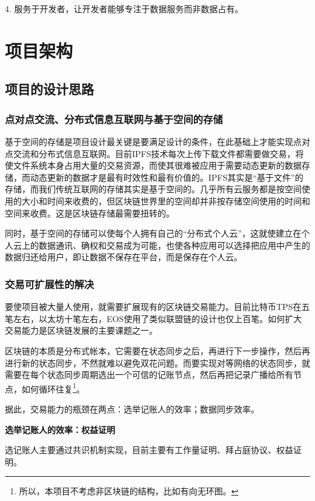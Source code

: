 \documentclass[a4paper,12pt]{article}
\begin{document}
4. 服务于开发者，让开发者能够专注于数据服务而非数据占有。

\section{项目架构}

\subsection{项目的设计思路}
\subsubsection{点对点交流、分布式信息互联网与基于空间的存储}

基于空间的存储是项目设计最关键是要满足设计的条件，在此基础上才能实现点对点交流和分布式信息互联网。目前IPFS技术每次上传下载文件都需要做交易，将使文件系统本身占用大量的交易资源，而使其很难被应用于需要动态更新的数据存储，而动态更新的数据才是最有时效性和最有价值的。IPFS其实是“基于文件”的存储，而我们传统互联网的存储其实是基于空间的。几乎所有云服务都是按空间使用的大小和时间来收费的，但区块链世界里的空间却并非按存储空间使用的时间和空间来收费。这是区块链存储最需要扭转的。

同时，基于空间的存储可以使每个人拥有自己的“分布式个人云”，这就使建立在个人云上的数据通讯、确权和交易成为可能，也使各种应用可以选择把应用中产生的数据归还给用户，即让数据不保存在平台，而是保存在个人云。

\subsubsection{交易可扩展性的解决}

要使项目被大量人使用，就需要扩展现有的区块链交易能力。目前比特币TPS在五笔左右，以太坊十笔左右，EOS使用了类似联盟链的设计也仅上百笔。如何扩大交易能力是区块链发展的主要课题之一。

区块链的本质是分布式帐本，它需要在状态同步之后，再进行下一步操作，然后再进行新的状态同步，不然就难以避免双花问题。而要实现对等网络的状态同步，就需要在每个状态同步周期选出一个可信的记账节点，然后再把记录广播给所有节点，如何循环往复\footnote{所以，本项目不考虑非区块链的结构，比如有向无环图。}。

据此，交易能力的瓶颈在两点：选举记账人的效率；数据同步效率。

\textbf{选举记账人的效率：权益证明}

选记账人主要通过共识机制实现，目前主要有工作量证明、拜占庭协议、权益证明。
\end{document}
